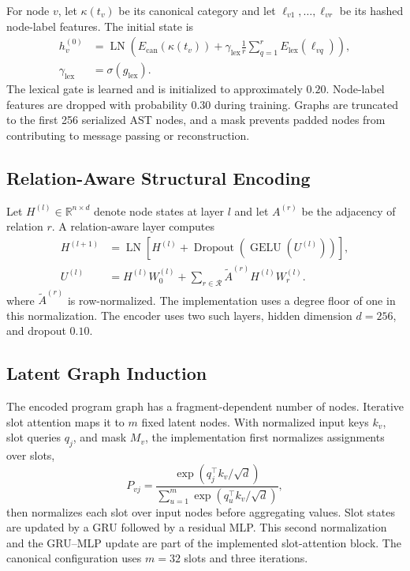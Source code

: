 \documentclass[authoryear,final,5p,times,twocolumn]{elsarticle}
\newcommand{\added}[1]{{\color{green!50!black}#1}}
\theoremstyle{plain}
\begin{document}
For node $v$, let $\kappa(t_v)$ be its canonical category and let
$\ell_{v1},\ldots,\ell_{vr}$ be its hashed node-label features. The initial
state is
\begin{equation}
\begin{aligned}
h_v^{(0)}
&=\operatorname{LN}\!\left(
E_{\mathrm{can}}(\kappa(t_v))
+\gamma_{\mathrm{lex}}\frac{1}{r}
\sum_{q=1}^{r}E_{\mathrm{lex}}(\ell_{vq})
\right),\\
\gamma_{\mathrm{lex}}
&=\sigma(g_{\mathrm{lex}}).
\end{aligned}
\label{eq:node_initialization}
\end{equation}
\added{The lexical gate is learned and is initialized to approximately $0.20$.
Node-label features are dropped with probability $0.30$ during training. Graphs
are truncated to the first 256 serialized AST nodes, and a mask prevents padded
nodes from contributing to message passing or reconstruction.}

\subsection{Relation-Aware Structural Encoding}
\label{sec:relation_encoder}

Let $H^{(l)}\in\mathbb{R}^{n\times d}$ denote node states at layer $l$ and
let $A^{(r)}$ be the adjacency of relation $r$. A relation-aware layer computes
\begin{equation}
\begin{aligned}
H^{(l+1)}
&=\operatorname{LN}\!\left[
H^{(l)}+\operatorname{Dropout}\!\left(
\operatorname{GELU}(U^{(l)})
\right)\right],\\
U^{(l)}
&=H^{(l)}W_0^{(l)}+
\sum_{r\in\mathcal{R}}
\widetilde{A}^{(r)}H^{(l)}W_r^{(l)}.
\end{aligned}
\label{eq:relation_layer}
\end{equation}
where $\widetilde{A}^{(r)}$ is row-normalized. \added{The implementation uses a
degree floor of one in this normalization.}
The encoder uses two such layers, hidden dimension $d=256$, and dropout $0.10$.

\subsection{Latent Graph Induction}
\label{sec:latent_induction}

The encoded program graph has a fragment-dependent number of nodes. Iterative
slot attention maps it to $m$ fixed latent nodes. With normalized input keys
$k_v$, slot queries $q_j$, and mask $M_v$, the implementation first normalizes
assignments over slots,
\begin{equation}
P_{vj}=
\frac{\exp(q_j^{\top}k_v/\sqrt{d})}
{\sum_{u=1}^{m}\exp(q_u^{\top}k_v/\sqrt{d})},
\label{eq:slot_assignment}
\end{equation}
then normalizes each slot over input nodes before aggregating values. Slot states
are updated by a GRU followed by a residual MLP. \added{This second normalization
and the GRU--MLP update are part of the implemented slot-attention block.} The
canonical configuration uses $m=32$ slots and three iterations.
\end{document}

